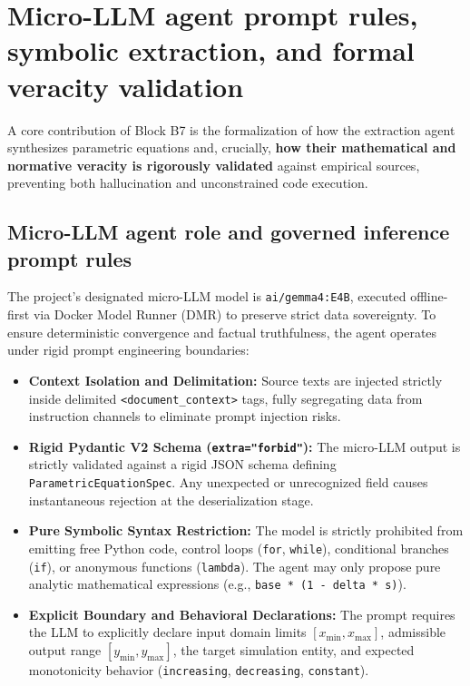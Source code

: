 \documentclass[11pt,a4paper]{article}
\begin{document}
\section{Micro-LLM agent prompt rules, symbolic extraction, and formal veracity validation}

A core contribution of Block B7 is the formalization of how the extraction agent synthesizes parametric equations and, crucially, \textbf{how their mathematical and normative veracity is rigorously validated} against empirical sources, preventing both hallucination and unconstrained code execution.

\subsection{Micro-LLM agent role and governed inference prompt rules}

The project's designated micro-LLM model is \texttt{ai/gemma4:E4B}, executed offline-first via Docker Model Runner (DMR) to preserve strict data sovereignty. To ensure deterministic convergence and factual truthfulness, the agent operates under rigid prompt engineering boundaries:

\begin{itemize}[leftmargin=*]
    \item \textbf{Context Isolation and Delimitation:} Source texts are injected strictly inside delimited \texttt{<document\_context>} tags, fully segregating data from instruction channels to eliminate prompt injection risks.
    \item \textbf{Rigid Pydantic V2 Schema (\texttt{extra="forbid"}):} The micro-LLM output is strictly validated against a rigid JSON schema defining \texttt{ParametricEquationSpec}. Any unexpected or unrecognized field causes instantaneous rejection at the deserialization stage.
    \item \textbf{Pure Symbolic Syntax Restriction:} The model is strictly prohibited from emitting free Python code, control loops (\texttt{for}, \texttt{while}), conditional branches (\texttt{if}), or anonymous functions (\texttt{lambda}). The agent may only propose pure analytic mathematical expressions (e.g., \texttt{base * (1 - delta * s)}).
    \item \textbf{Explicit Boundary and Behavioral Declarations:} The prompt requires the LLM to explicitly declare input domain limits $[x_{\min}, x_{\max}]$, admissible output range $[y_{\min}, y_{\max}]$, the target simulation entity, and expected monotonicity behavior (\texttt{increasing}, \texttt{decreasing}, \texttt{constant}).
\end{itemize}
\end{document}
